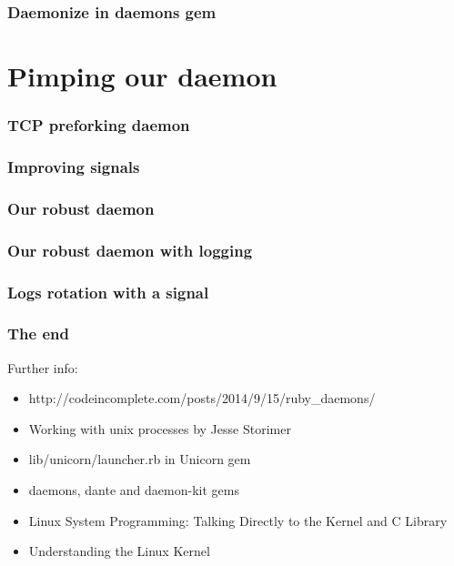 \documentclass{beamer}
\begin{document}
\begin{frame}
  \frametitle{Daemonize in daemons gem}

  \fontsize{6}{2}\selectfont{From https://github.com/ghazel/daemons/blob/master/lib/daemons/daemonize.rb}

  
\end{frame}


\section{Pimping our daemon}


\begin{frame}
  \frametitle{TCP preforking daemon}
  
  
\end{frame}


\begin{frame}
  \frametitle{Improving signals}
  
\end{frame}


\begin{frame}
  \frametitle{Our robust daemon}
  
  
\end{frame}


\begin{frame}
  \frametitle{Our robust daemon with logging}
  
  
\end{frame}


\begin{frame}
  \frametitle{Logs rotation with a signal}

  \fontsize{6}{6}\selectfont{From https://github.com/kennethkalmer/daemon-kit/blob/master/lib/daemon\_kit/application.rb}
  
\end{frame}


\begin{frame}
  \frametitle{The end}
  \pause Further info:
  \begin{itemize}
    \item http://codeincomplete.com/posts/2014/9/15/ruby\_daemons/
    \item Working with unix processes by Jesse Storimer
    \item lib/unicorn/launcher.rb in Unicorn gem
    \item daemons, dante and daemon-kit gems
    \item Linux System Programming: Talking Directly to the Kernel and C Library
    \item Understanding the Linux Kernel
  \end{itemize}
  \pause \fontsize{36}{36}\selectfont{Questions?}
  \pause \fontsize{36}{36}\selectfont{Thanks!}
\end{frame}
\end{document}
